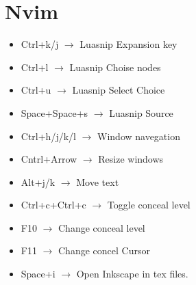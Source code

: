\documentclass[a4paper,10pt]{article}
\begin{document}
\section{Nvim}
\begin{itemize}
  \item Ctrl+k/j $\to$ Luasnip Expansion key
  \item Ctrl+l  $\to$ Luasnip Choise nodes
  \item Ctrl+u $\to$ Luasnip Select Choice
  \item Space+Space+s $\to$ Luasnip Source
  \item Ctrl+h/j/k/l $\to$ Window navegation
  \item Cntrl+Arrow $\to$ Resize windows
  \item Alt+j/k $\to$ Move text
  \item Ctrl+c+Ctrl+c $\to$ Toggle conceal level
  \item F10 $\to$ Change conceal level
  \item F11 $\to$ Change concel Cursor
  \item Space+i $\to$ Open Inkscape in tex files.
\end{itemize}
\end{document}
